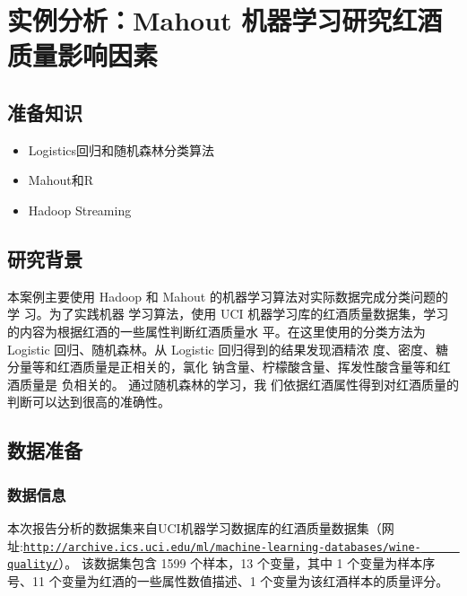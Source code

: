\section{实例分析：Mahout
机器学习研究红酒质量影响因素}\label{ux5b9eux4f8bux5206ux6790mahout-ux673aux5668ux5b66ux4e60ux7814ux7a76ux7ea2ux9152ux8d28ux91cfux5f71ux54cdux56e0ux7d20}

\subsection{准备知识}\label{ux51c6ux5907ux77e5ux8bc6}

\begin{itemize}
\itemsep1pt\parskip0pt
\item
  Logistics回归和随机森林分类算法
\item
  Mahout和R
\item
  Hadoop Streaming
\end{itemize}

\subsection{研究背景}\label{ux7814ux7a76ux80ccux666f}

本案例主要使用 Hadoop 和 Mahout 的机器学习算法对实际数据完成分类问题的学
习。为了实践机器 学习算法，使用 UCI
机器学习库的红酒质量数据集，学习的内容为根据红酒的一些属性判断红酒质量水
平。在这里使用的分类方法为 Logistic 回归、随机森林。从 Logistic
回归得到的结果发现酒精浓 度、密度、糖分量等和红酒质量是正相关的，氯化
钠含量、柠檬酸含量、挥发性酸含量等和红酒质量是 负相关的。
通过随机森林的学习，我
们依据红酒属性得到对红酒质量的判断可以达到很高的准确性。

\subsection{数据准备}\label{ux6570ux636eux51c6ux5907}

\subsubsection{数据信息}\label{ux6570ux636eux4fe1ux606f}

本次报告分析的数据集来自UCI机器学习数据库的红酒质量数据集（网
址:\href{http://archive.ics.uci.edu/ml/machine-learning-databases/wine-quality/}{\lstinline|http://archive.ics.uci.edu/ml/machine-learning-databases/wine-      quality/|}）。
该数据集包含 1599 个样本，13 个变量，其中 1 个变量为样本序号、11
个变量为红酒的一些属性数值描述、1 个变量为该红酒样本的质量评分。

